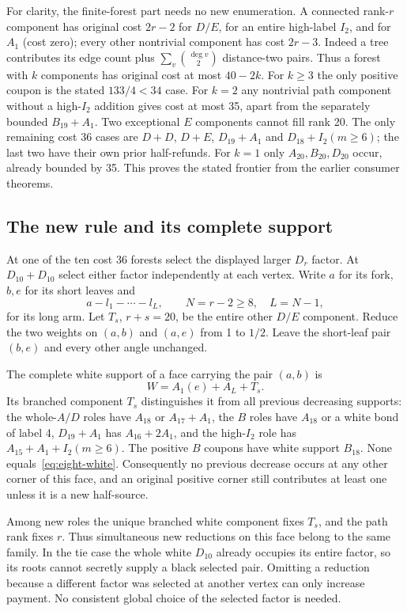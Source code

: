 For clarity, the finite-forest part needs no new enumeration. A
connected rank-$r$ component has original cost $2r-2$ for $D/E$,
for an entire high-label $I_2$, and for $A_1$ (cost zero); every other
nontrivial component has cost $2r-3$. Indeed a tree contributes its
edge count plus $\sum_v\binom{\deg v}{2}$ distance-two pairs. Thus
a forest with $k$ components has original cost at most $40-2k$.
For $k\ge3$ the only positive coupon is the stated $133/4<34$ case.
For $k=2$ any nontrivial path component without a high-$I_2$ addition
gives cost at most 35, apart from the separately bounded $B_{19}+A_1$.
Two exceptional $E$ components cannot fill rank 20. The only remaining
cost 36 cases are $D+D$, $D+E$, $D_{19}+A_1$ and
$D_{18}+I_2(m\ge6)$; the last two have their own prior half-refunds.
For $k=1$ only $A_{20},B_{20},D_{20}$ occur, already bounded by 35.
This proves the stated frontier from the earlier consumer theorems.

\subsection{The new rule and its complete support}
At one of the ten cost 36 forests select the displayed larger $D_r$
factor. At $D_{10}+D_{10}$ select either factor independently at each
vertex. Write $a$ for its fork, $b,e$ for its short leaves and
\[
 a-l_1-\cdots-l_L,\qquad N=r-2\ge8,\quad L=N-1,
\]
for its long arm. Let $T_s$, $r+s=20$, be the entire other $D/E$
component. Reduce the two weights on $(a,b)$ and $(a,e)$ from 1 to
$1/2$. Leave the short-leaf pair $(b,e)$ and every other angle unchanged.

The complete white support of a face carrying the pair $(a,b)$ is
\begin{equation}\label{eq:eight-white}
 W=A_1(e)+A_L+T_s.
\end{equation}
Its branched component $T_s$ distinguishes it from all previous
decreasing supports: the whole-$A/D$ roles have $A_{18}$ or
$A_{17}+A_1$, the $B$ roles have $A_{18}$ or a white bond of label 4,
$D_{19}+A_1$ has $A_{16}+2A_1$, and the high-$I_2$ role has
$A_{15}+A_1+I_2(m\ge6)$. The positive $B$ coupons have white support
$B_{18}$. None equals~\eqref{eq:eight-white}. Consequently no previous
decrease occurs at any other corner of this face, and an original
positive corner still contributes at least one unless it is a new
half-source.

Among new roles the unique branched white component fixes $T_s$, and
the path rank fixes $r$. Thus simultaneous new reductions on this face
belong to the same family. In the tie case the whole white $D_{10}$
already occupies its entire factor, so its roots cannot secretly supply
a black selected pair. Omitting a reduction because a different factor
was selected at another vertex can only increase payment. No consistent
global choice of the selected factor is needed.

